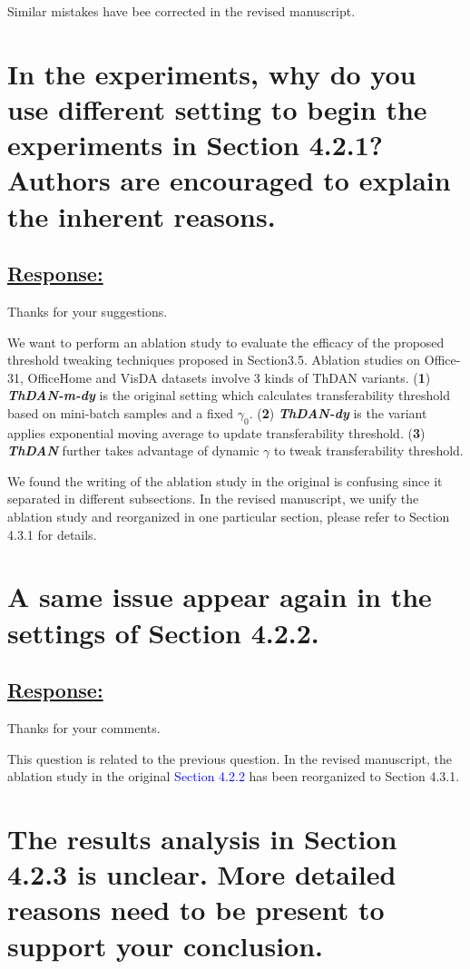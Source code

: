 Similar mistakes have bee corrected in the revised manuscript.

\section{
    In the experiments, why do you use different setting to begin the experiments in Section 4.2.1? Authors are encouraged to explain the inherent reasons. 
}

\subsection*{\underline{\textbf{Response:}}}

Thanks for your suggestions.

We want to perform an ablation study to evaluate the efficacy of the proposed threshold tweaking techniques proposed in Section3.5. 
Ablation studies on Office-31, OfficeHome and VisDA datasets involve 3 kinds of ThDAN variants.
(\textbf{1}) \textit{\textbf{ThDAN-m-dy}} is the original setting which calculates transferability threshold based on mini-batch samples and a fixed $\gamma_0$. 
(\textbf{2}) \textit{\textbf{ThDAN-dy}} is the variant applies exponential moving average to update transferability threshold. 
(\textbf{3}) \textit{\textbf{ThDAN}} further takes advantage of dynamic $\gamma$ to tweak transferability threshold. 

We found the writing of the ablation study in the original is confusing since it separated in different subsections. 
In the revised manuscript, we unify the ablation study and reorganized in one particular section, please refer to Section 4.3.1 for details. 

\section{
    A same issue appear again in the settings of Section 4.2.2.  
}

\subsection*{\underline{\textbf{Response:}}}

Thanks for your comments.

This question is related to the previous question.
In the revised manuscript, the ablation study in the original \textcolor{blue}{Section 4.2.2} has been reorganized to Section 4.3.1.

\section{
    The results analysis in Section 4.2.3 is unclear. More detailed reasons need to be present to support your conclusion.  
}

